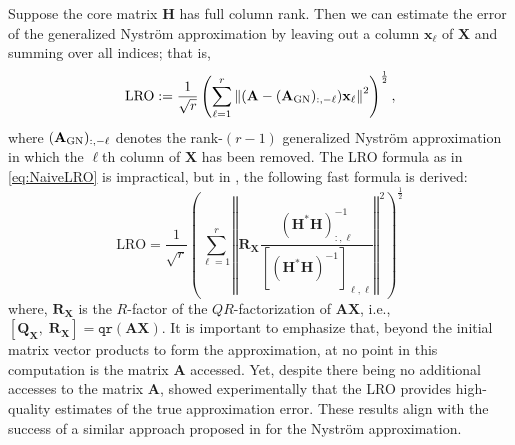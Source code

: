 \documentclass[11pt]{article}
\newcommand{\GN}{generalized Nyström}
\newcommand{\Ny}{Nyström}
\newcommand{\gnX}{\mathbf{A}_{\textup{GN}}}
\newcommand{\jcol}[2]{#1_{:, #2}} %
\newcommand{\jk}[3]{[#1]_{#2, #3}} %
\newcommand{\njcol}[2]{#1_{:, -#2}} %
\begin{document}
Suppose the core matrix $\mathbf{H}$ has full column rank.
Then we can estimate the error of the \GN{} approximation by leaving out a column $\mathbf{x}_\ell$ of $\mathbf{X}$ and summing over all indices; that is,
\begin{equation}
    \label{eq:NaiveLRO}
    \text{LRO} := \frac{1}{\sqrt{r}} \left( \sum_{\ell=1}^{r}  \left\Vert (\mathbf{A} - \njcol{(\mathbf{\gnX})}{\ell} ) \mathbf{x}_\ell \right\Vert^2 \right)^{\frac{1}{2}},
\end{equation}
where $\njcol{(\mathbf{\gnX})}{\ell}$ denotes the rank-$(r-1)$ generalized Nystr\"om approximation in which the $\ell$th column of $\mathbf{X}$ has been removed.
The LRO formula as in \eqref{eq:NaiveLRO} is  impractical, but in \cite{LazPearPrit26}, the following fast formula is derived:
\begin{equation}
    \label{eq:replicateLRO}
    \text{LRO} = \frac{1}{\sqrt{r}} \left( \sum_{\ell=1}^{r}  \left\Vert \mathbf{R_X} \frac{\jcol{(\mathbf{H}^*\mathbf{H})^{-1}}{\ell}}{\jk{(\mathbf{H}^*\mathbf{H})^{-1}}{\ell}{\ell}} \right\Vert^2 \right)^{\frac{1}{2}}
\end{equation}
where, $\mathbf{R_X}$ is the $R$-factor of the $QR$-factorization of $\mathbf{A}\mathbf{X}$, i.e., $[ \mathbf{Q}_\mathbf{X}, \; \mathbf{R}_\mathbf{X}] = \texttt{qr}(\mathbf{A}\mathbf{X})$. It is important to emphasize that, beyond the initial matrix vector products to form the approximation, at no point in this computation is the matrix $\mathbf{A}$ accessed. Yet, despite there being no additional accesses to the matrix $\mathbf{A}$, \cite{LazPearPrit26} showed experimentally that the LRO provides high-quality estimates of the true approximation error. These results align with the success of a similar approach proposed in \cite{EpperlyTropp_VarianceEst2024} for the \Ny{} approximation.
\end{document}
